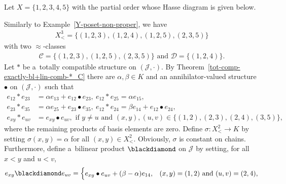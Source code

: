 \documentclass{jonasart}
\newcommand{\af}{\alpha}
\newcommand{\bl}{\bullet}
\newcommand{\bt}{\beta}
\newcommand{\C}{\mathcal{C}}
\newcommand{\D}{\mathcal{D}}
\newcommand{\J}{\mathcal{J}}
\newcommand{\sg}{\sigma}
\begin{document}
	\begin{example}\label{Y-poset-proper}
		Let $X=\{1,2,3,4,5\}$ with the partial order whose Hasse diagram is given below.
		\begin{center}
		\end{center}
		Similarly to Example~\ref{Y-poset-non-proper}, we have
		\begin{align*}
			X^3_< =\{(1,2,3),(1,2,4),(1,2,5),(2,3,5)\}
		\end{align*}
		with two $\approx$-classes
		\begin{align*}
			\C=\{(1,2,3),(1,2,5),(2,3,5)\}\text{ and }\D=\{(1,2,4)\}.
		\end{align*}
		Let $*$ be a~totally compatible structure on $(\J,\cdot)$. By Theorem~\ref{tot-comp-exactly-bl+lin-comb-*_C} there are $\af,\bt\in K$ and an annihilator-valued structure $\bl$ on $(\J,\cdot)$ such that
		\begin{align*}
			e_{12}* e_{23}&=\af e_{13}+e_{12}\bl e_{23},\ e_{12}* e_{25}=\af e_{15},\\
			e_{23}* e_{35}&=\af e_{25}+e_{23}\bl e_{35},\ e_{12}* e_{24}=\bt e_{14}+e_{12}\bl e_{24},\\
			e_{xy}*e_{uv}&=e_{xy}\bl e_{uv}, \text{ if }y\ne u\text{ and }(x,y),(u,v)\in\{(1,2),(2,3),(2,4),(3,5)\},
		\end{align*}
		where the remaining products of basis elements are zero. Define $\sg:X^2_<\to K$ by setting $\sg(x,y)=\af$ for all $(x,y)\in X^2_<$. Obviously, $\sg$ is constant on chains. Furthermore, define a~bilinear product $\blackdiamond$ on $\J$ by setting, for all $x<y$ and $u<v$,
		\begin{align}\label{e_x y-blackdiamond-e_u v=e_x y-bl-e_u v+ann}
			e_{xy}\blackdiamond e_{uv}=
			\begin{cases}
				e_{xy}\bl e_{uv}+(\bt-\af) e_{14}, & (x,y)=(1,2)\text{ and }(u,v)=(2,4),\\

\end{cases}
\end{align}
\end{example}
\end{document}
